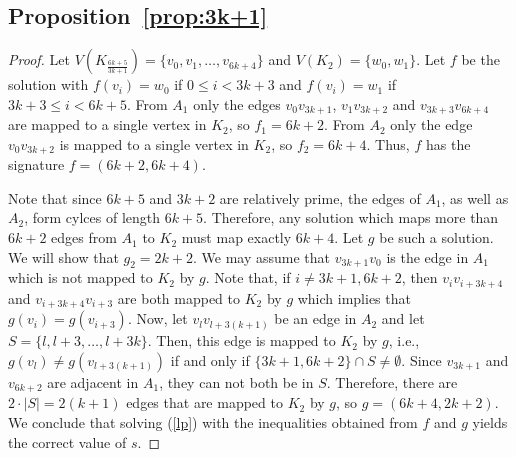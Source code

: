 \documentclass[11pt,a4paper]{article}
\begin{document}
\subsection*{Proposition~\ref{prop:3k+1}}
\begin{proof}
Let $V(K_{\frac{6k+5}{3k+1}}) = \{v_0,v_1,\ldots,v_{6k+4}\}$ and $V(K_2) = \{w_0, w_1\}$. 
Let $f$ be the solution with $f(v_i) = w_0$ if $0 \leq i < 3k+3$ and $f(v_i) = w_1$
if $3k+3 \leq i < 6k+5$.
From $A_1$ only the edges $v_0 v_{3k+1}$, $v_1 v_{3k+2}$ and $v_{3k+3} v_{6k+4}$ are mapped to a single vertex in $K_2$, so $f_1=6k+2$. From $A_2$ only the edge $v_0 v_{3k+2}$ is mapped to a single vertex in $K_2$, so $f_2=6k+4$.
Thus, $f$ has the signature $f = (6k+2, 6k+4)$.



Note that since $6k+5$ and $3k+2$ are relatively prime, the edges of $A_1$, 
as well as $A_2$, form cylces of length $6k+5$.
Therefore, any solution which maps more than $6k+2$ edges from $A_1$ to $K_2$ 
must map exactly $6k+4$.
Let $g$ be such a solution. We will show that $g_2 = 2k+2$.
We may assume that $v_{3k+1} v_0$ is the edge in $A_1$ which is not
mapped to $K_2$ by $g$.
Note that, if $i \neq 3k+1, 6k+2$, then $v_i v_{i+3k+4}$ and $v_{i+3k+4} v_{i+3}$
are both mapped to $K_2$ by $g$ which implies that $g(v_i) = g(v_{i+3})$.
Now, let $v_l v_{l+3(k+1)}$ be an edge in $A_2$ and let
$S = \{l, l+3, \ldots, l+3k\}$.
Then, this edge is mapped to $K_2$ by $g$, i.e., $g(v_l) \neq g(v_{l+3(k+1)})$ 
if and only if
$\{3k+1, 6k+2\} \cap S \neq \emptyset$.
Since $v_{3k+1}$ and $v_{6k+2}$ are adjacent in $A_1$, they can not
both be in $S$.
Therefore, there are $2 \cdot |S| = 2(k+1)$ edges that are mapped
to $K_2$ by $g$, so $g = (6k+4, 2k+2)$.
We conclude that solving (\ref{lp}) with the inequalities obtained from
$f$ and $g$ yields the correct value of $s$.
\end{proof}
\end{document}
